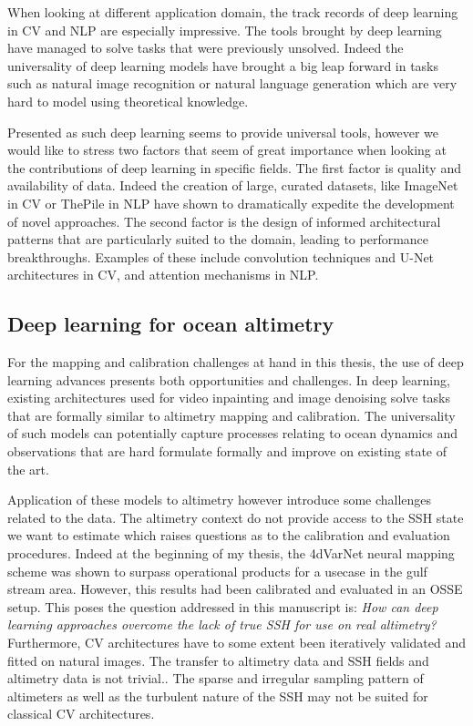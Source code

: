 \begin{bibunit}
When looking at different application domain, the track records of deep learning in CV\cite{chaiDeepLearningComputer2021} and NLP\cite{brownLanguageModelsAre2020} are especially impressive. 
The tools brought by deep learning have managed to solve tasks that were previously unsolved.
Indeed the universality of deep learning models have brought a big leap forward in tasks such as natural image recognition or natural language generation which are very hard to model using theoretical knowledge.

Presented as such deep learning seems to provide universal tools,  
however we would like to stress two factors that seem of great importance when looking at the contributions of deep learning in specific fields.
The first factor is quality and availability of data.
Indeed the creation of large, curated datasets, like ImageNet\cite{dengImageNetLargescaleHierarchical2009} in CV or ThePile\cite{gaoPile800GBDataset2020} in NLP have shown to dramatically expedite the development of novel approaches. 
The second factor is the design of informed architectural patterns that are particularly suited to the domain, leading to performance breakthroughs.
Examples of these include convolution techniques\cite{lecunHandwrittenDigitRecognition1989} and U-Net architectures\cite{ronnebergerUNetConvolutionalNetworks2015} in CV, and attention mechanisms\cite{vaswaniAttentionAllYou} in NLP.


\subsection*{Deep learning for ocean altimetry}
For the mapping and calibration challenges at hand in this thesis, the use of deep learning advances presents both opportunities and challenges.
In deep learning, existing architectures used for video inpainting\cite{kimDeepVideoInpainting} and image denoising\cite{tianDeepLearningImage2020} solve tasks that are formally similar to altimetry mapping and calibration.
The universality of such models can potentially capture processes relating to ocean dynamics and observations that are hard formulate formally and improve on existing state of the art.

Application of these models to altimetry however introduce some challenges related to the data.
The altimetry context do not provide access to the SSH state we want to estimate which raises questions as to the calibration and evaluation procedures.
Indeed at the beginning of my thesis, the 4dVarNet neural mapping scheme was shown to surpass operational products for a usecase in the gulf stream area\cite{fabletENDTOENDPHYSICSINFORMEDREPRESENTATION2021}. However, this results had been calibrated and evaluated in an OSSE setup. 
This poses the question addressed in this manuscript is: \textit{How can deep learning approaches overcome the lack of true SSH for use on real altimetry?}
Furthermore, CV architectures have to some extent been iteratively validated and fitted on natural images.
The transfer to altimetry data and SSH fields and altimetry data is not trivial..
The sparse and irregular sampling pattern of altimeters  as well as the turbulent nature of the SSH may not be suited for classical CV architectures.


\end{bibunit}
